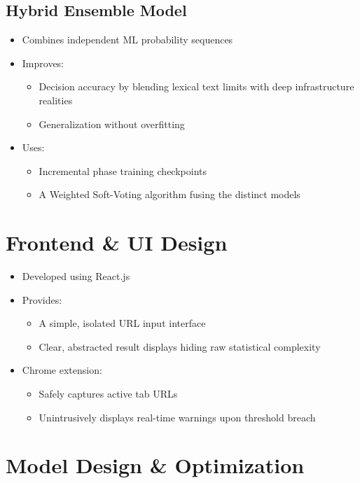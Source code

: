 \subsection{Hybrid Ensemble Model}

\begin{itemize}
    \item Combines independent ML probability sequences
    \item Improves:
    \begin{itemize}
        \item Decision accuracy by blending lexical text limits with deep infrastructure realities
        \item Generalization without overfitting
    \end{itemize}
    \item Uses:
    \begin{itemize}
        \item Incremental phase training checkpoints
        \item A Weighted Soft-Voting algorithm fusing the distinct models
    \end{itemize}
\end{itemize}

\section{Frontend \& UI Design}

\begin{itemize}
    \item Developed using React.js \cite{ref9}
    \item Provides:
    \begin{itemize}
        \item A simple, isolated URL input interface
        \item Clear, abstracted result displays hiding raw statistical complexity
    \end{itemize}
    \item Chrome extension:
    \begin{itemize}
        \item Safely captures active tab URLs
        \item Unintrusively displays real-time warnings upon threshold breach
    \end{itemize}
\end{itemize}

\section{Model Design \& Optimization}

